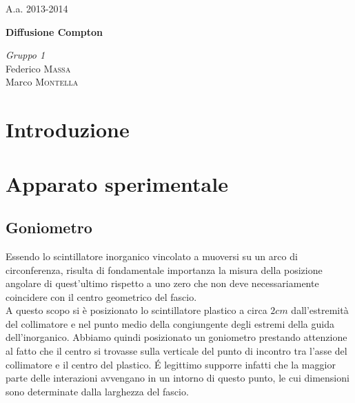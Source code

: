 \documentclass[11pt]{article}
\begin{document}
\justify
\printindex
\Large{A.a. 2013-2014}
\vspace{10cm}
\begin{center}
\Huge\textbf{Diffusione Compton}
\end{center}

\vspace{2cm}
\begin{flushleft}
\textit{Gruppo \textsc{1}} \\
\medskip
Federico \textsc{Massa} \\ 
Marco \textsc{Montella}
\end{flushleft}



\newpage

\begin{abstract}
\justify
 

\end{abstract}
\bigskip

\section{Introduzione}



\section{Apparato sperimentale} \label{sec:apparato}
\subsection{Goniometro}



Essendo lo scintillatore inorganico vincolato a muoversi su un arco di circonferenza, risulta di fondamentale importanza la misura della posizione angolare di quest'ultimo rispetto a uno zero che non deve necessariamente coincidere con il centro geometrico del fascio. \\
A questo scopo si è posizionato lo scintillatore plastico a circa $2 cm$ dall'estremità del collimatore e nel punto medio della congiungente degli estremi della guida dell'inorganico. Abbiamo quindi posizionato un goniometro prestando attenzione al fatto che il centro si trovasse sulla verticale del punto di incontro tra l'asse del collimatore e il centro del plastico. \'E legittimo supporre infatti che la maggior parte delle interazioni avvengano in un intorno di questo punto, le cui dimensioni sono determinate dalla larghezza del fascio. \\
\end{document}
